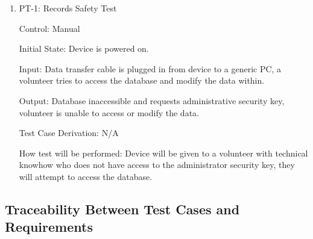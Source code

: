 \documentclass[12pt, titlepage]{article}
\begin{document}
\begin{enumerate}
\begin{enumerate}

\item{PT-1: Records Safety Test\\}

Control: Manual

Initial State: Device is powered on.

Input: Data transfer cable is plugged in from device to a generic PC, a volunteer tries to access the database and modify the data within.

Output: Database inaccessible and requests administrative security key, volunteer is unable to access or modify the data.

Test Case Derivation: N/A

How test will be performed: Device will be given to a volunteer with technical knowhow who does not have access to the administrator security key, they will attempt to access the database. 


\end{enumerate}



\subsection{Traceability Between Test Cases and Requirements}



\end{enumerate}
\end{document}

